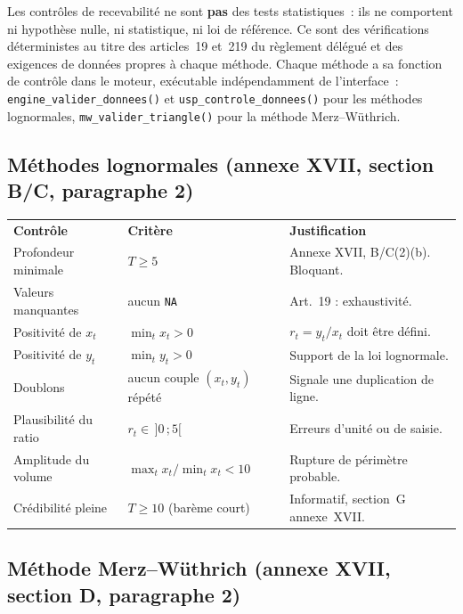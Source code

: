 \documentclass[a4paper,11pt]{article}
\newcommand{\code}[1]{\texttt{\small #1}}
\begin{document}
Les contrôles de recevabilité ne sont \textbf{pas} des tests statistiques~: ils ne
comportent ni hypothèse nulle, ni statistique, ni loi de référence. Ce sont des
vérifications déterministes au titre des articles~19 et~219 du règlement délégué
et des exigences de données propres à chaque méthode. Chaque méthode a sa
fonction de contrôle dans le moteur, exécutable indépendamment de l'interface~:
\code{engine\_valider\_donnees()} et \code{usp\_controle\_donnees()} pour les
méthodes lognormales, \code{mw\_valider\_triangle()} pour la méthode
Merz--Wüthrich.

\subsection*{Méthodes lognormales (annexe XVII, section B/C, paragraphe 2)}

\begin{center}
\small
{}
\begin{tabular}{@{}p{4.4cm}p{5.0cm}p{5.4cm}@{}}
\rowcolor{tableheader}
\textcolor{financeblue}{\textbf{Contrôle}} &
\textcolor{financeblue}{\textbf{Critère}} &
\textcolor{financeblue}{\textbf{Justification}} \\
Profondeur minimale & $T \ge 5$ & Annexe XVII, B/C(2)(b). Bloquant. \\
Valeurs manquantes & aucun \code{NA} & Art.~19 : exhaustivité. \\
Positivité de $x_t$ & $\min_t x_t > 0$ & $r_t = y_t/x_t$ doit être défini. \\
Positivité de $y_t$ & $\min_t y_t > 0$ & Support de la loi lognormale. \\
Doublons & aucun couple $(x_t,y_t)$ répété & Signale une duplication de ligne. \\
Plausibilité du ratio & $r_t \in\, ]0\,;5[$ & Erreurs d'unité ou de saisie. \\
Amplitude du volume & $\max_t x_t/\min_t x_t < 10$ & Rupture de périmètre probable. \\
Crédibilité pleine & $T \ge 10$ (barème court) & Informatif, section~G annexe~XVII. \\
\end{tabular}
\end{center}

\subsection*{Méthode Merz--Wüthrich (annexe XVII, section D, paragraphe 2)}
\end{document}
